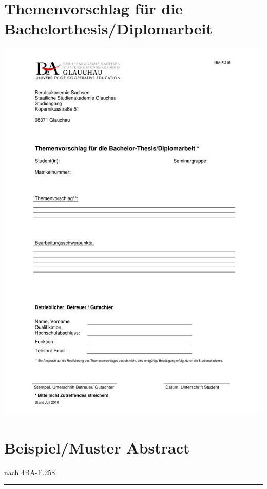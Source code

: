 \chapter{Themenvorschlag für die Bachelorthesis/Diplomarbeit}
\label{anhang-themenvorschlag-bt-dipl}
\includegraphics[scale=0.8]{Anhang/4BA-F.215_Themenvorschlag_für_die_Bachelor-Thesis_ausfüllbar.pdf}
\clearpage
{}


\clearpage


\clearpage

\chapter{Beispiel/Muster Abstract}
\label{anhang-abstract}
\begin{minipage}{0.5\columnwidth}
    
\end{minipage}
\begin{minipage}{0.45\columnwidth}
    \begin{flushright}
        {\small nach 4BA-F.258\\}
    \end{flushright}
\end{minipage}
\par\noindent\rule{\columnwidth}{.5pt}


